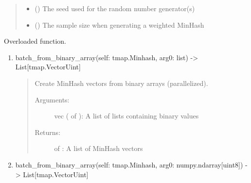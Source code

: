 \documentclass[letterpaper,10pt,english]{sphinxmanual}
\begin{document}
\begin{fulllineitems}
\begin{fulllineitems}
\begin{quote}
\begin{description}
\begin{itemize}
\item {} 
 () \textendash{} The seed used for the random number generator(s)

\item {} 
 () \textendash{} The sample size when generating a weighted MinHash

\end{itemize}

\end{description}\end{quote}

\end{fulllineitems}


\begin{fulllineitems}
\label{\detokenize{documentation:tmap.Minhash.batch_from_binary_array}}
Overloaded function.
\begin{enumerate}
\def\theenumi{\arabic{enumi}}
\def\labelenumi{\theenumi .}
\makeatletter\def\p@enumii{\p@enumi \theenumi .}\makeatother
\item {} 
batch\_from\_binary\_array(self: tmap.Minhash, arg0: list) -\textgreater{} List{[}tmap.VectorUint{]}
\begin{quote}

Create MinHash vectors from binary arrays (parallelized).
\begin{description}
\item[{Arguments:}] \leavevmode
vec ( of ): A list of lists containing binary values

\item[{Returns:}] \leavevmode
{} of : A list of MinHash vectors

\end{description}
\end{quote}

\item {} 
batch\_from\_binary\_array(self: tmap.Minhash, arg0: numpy.ndarray{[}uint8{]}) -\textgreater{} List{[}tmap.VectorUint{]}
\begin{quote}


\end{quote}
\end{enumerate}
\end{fulllineitems}
\end{fulllineitems}
\end{document}
